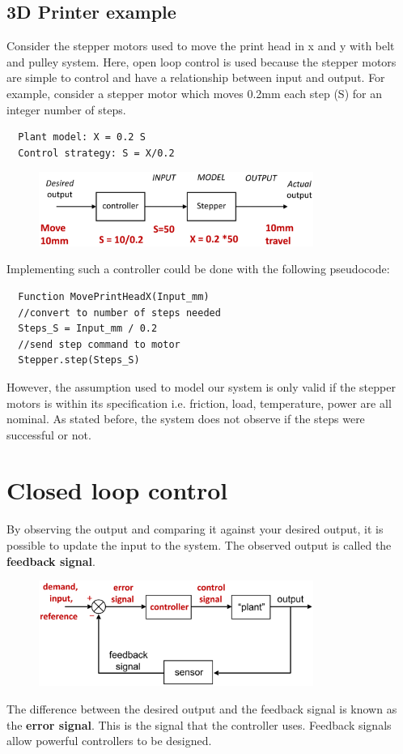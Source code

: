 \documentclass[class=report, crop=false, 12pt,a4paper]{standalone}
\begin{document}
\subsection*{3D Printer example}
Consider the stepper motors used to move the print head in x and y with belt and pulley system. Here, open loop control is used because the stepper motors are simple to control and have a relationship between input and output. For example, consider a stepper motor which moves 0.2\si{\milli\m} each step (S) for an integer number of steps. 
\begin{verbatim}
  Plant model: X = 0.2 S
  Control strategy: S = X/0.2
\end{verbatim}
\begin{figure}[H]
  \centering
  \includegraphics[width = 0.8\textwidth]{../img/controlstrat3dprinter.png}
\end{figure}
Implementing such a controller could be done with the following pseudocode:
\begin{verbatim}
  Function MovePrintHeadX(Input_mm)
  //convert to number of steps needed
  Steps_S = Input_mm / 0.2
  //send step command to motor
  Stepper.step(Steps_S)
\end{verbatim}
However, the assumption used to model our system is only valid if the stepper motors is within its specification i.e. friction, load, temperature, power are all nominal. As stated before, the system does not observe if the steps were successful or not. 
\section{Closed loop control}
By observing the output and comparing it against your desired output, it is possible to update the input to the system. The observed output is called the \textbf{feedback signal}.
\begin{figure}[H]
  \centering
  \includegraphics[width = 0.8\textwidth]{../img/closedloopcontrol.png}
\end{figure}
The difference between the desired output and the feedback signal is known as the \textbf{error signal}. This is the signal that the controller uses. Feedback signals allow powerful controllers to be designed.
\end{document}

